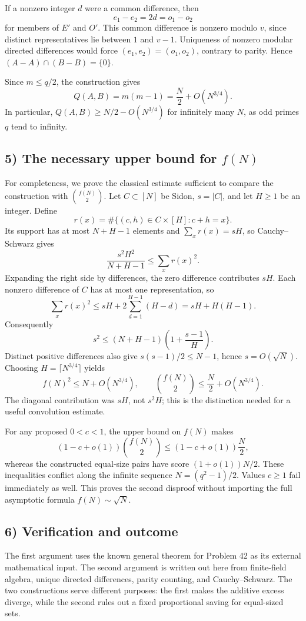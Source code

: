 If a nonzero integer $d$ were a common difference, then
\[
 e_1-e_2=2d=o_1-o_2
\]
for members of $E'$ and $O'$. This common difference is nonzero modulo
$v$, since distinct representatives lie between $1$ and $v-1$.
Uniqueness of nonzero modular directed differences would force
$(e_1,e_2)=(o_1,o_2)$, contrary to parity. Hence
$(A-A)\cap(B-B)=\{0\}$.

Since $m\leq q/2$, the construction gives
\[
 Q(A,B)=m(m-1)=\frac N2+O(N^{3/4}).
\]
In particular, $Q(A,B)\geq N/2-O(N^{3/4})$ for infinitely many
$N$, as odd primes $q$ tend to infinity.

\subsection{5) The necessary upper bound for $f(N)$}
For completeness, we prove the classical estimate sufficient to compare
the construction with $\binom{f(N)}2$. Let $C\subset[N]$ be Sidon,
$s=|C|$, and let $H\geq1$ be an integer. Define
\[
 r(x)=\#\{(c,h)\in C\times[H]:c+h=x\}.
\]
Its support has at most $N+H-1$ elements and $\sum_xr(x)=sH$, so
Cauchy--Schwarz gives
\[
 \frac{s^2H^2}{N+H-1}\leq\sum_xr(x)^2.
\]
Expanding the right side by differences, the zero difference contributes
$sH$. Each nonzero difference of $C$ has at most one representation, so
\[
 \sum_xr(x)^2
 \leq sH+2\sum_{d=1}^{H-1}(H-d)
 =sH+H(H-1).
\]
Consequently
\[
 s^2\leq(N+H-1)\left(1+\frac{s-1}{H}\right).
\]
Distinct positive differences also give $s(s-1)/2\leq N-1$, hence
$s=O(\sqrt N)$. Choosing $H=\lceil N^{3/4}\rceil$ yields
\[
 f(N)^2\leq N+O(N^{3/4}),\qquad
 \binom{f(N)}2\leq\frac N2+O(N^{3/4}).
\]
The diagonal contribution was $sH$, not $s^2H$; this is the distinction
needed for a useful convolution estimate.

For any proposed $0<c<1$, the upper bound on $f(N)$ makes
\[
 (1-c+o(1))\binom{f(N)}2
 \leq (1-c+o(1))\frac N2,
\]
whereas the constructed equal-size pairs have score
$(1+o(1))N/2$. These inequalities conflict along the infinite sequence
$N=(q^2-1)/2$. Values $c\geq1$ fail immediately as well.
This proves the second disproof without importing the full asymptotic
formula $f(N)\sim\sqrt N$.

\subsection{6) Verification and outcome}
The first argument uses the known general theorem for Problem 42 as its
external mathematical input. The second argument is written out here
from finite-field algebra, unique directed differences, parity counting,
and Cauchy--Schwarz. The two constructions serve different purposes:
the first makes the additive excess diverge, while the second rules out
a fixed proportional saving for equal-sized sets.

